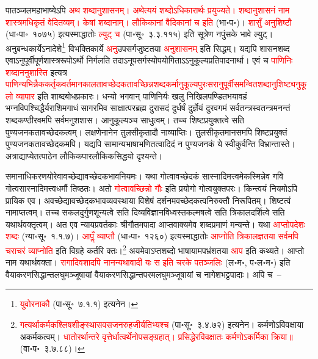 \begin{sloppypar}\justifying\noindent\hspace{10mm} पातञ्जल\-महाभाष्येऽपि \textcolor{red}{अथ शब्दानुशासनम्। अथेत्ययं शब्दोऽधिकारार्थः प्रयुज्यते। शब्दानुशासनं नाम शास्त्रमधिकृतं वेदितव्यम्। केषां शब्दानाम्। लौकिकानां वैदिकानां च इति} (भा॰प॰)। \textcolor{red}{शासुँ अनुशिष्टौ} (धा॰पा॰~१०७५) इत्यस्माद्धातोः \textcolor{red}{ल्युट् च} (पा॰सू॰~३.३.११५) इति सूत्रेण नपुंसके भावे ल्युट्। अनुबन्ध\-कार्येऽनादेशे\footnote{\textcolor{red}{युवोरनाकौ} (पा॰सू॰~७.१.१) इत्यनेन।} विभक्ति\-कार्ये \textcolor{red}{अनु}\-उपसर्ग\-जुष्टतया \textcolor{red}{अनुशासनम्} इति सिद्धम्। यद्यपि शासन\-शब्द एवाऽनुपूर्वी\-पूर्ण\-शास्त्ररूपोऽर्थो निर्गलति तदाऽनूपसर्गस्योप\-योगिताऽऽनुकूल्य\-प्रतिपादनार्था। एवं च \textcolor{red}{पाणिनिः शब्दाननुशास्ति} इत्यत्र \textcolor{red}{पाणिन्यभिन्नैक\-कर्तृक\-वर्तमान\-कालतावच्छेदकतावच्छिन्न\-शब्द\-कर्मानुकूल्य\-पुरःसरानुपूर्वी\-समन्वित\-शब्दानुशिष्ट्यनुकूलो व्यापार} इति शाब्द\-बोध\-प्रकारः। धन्यो भगवान् पाणिनिर्यः खलु निखिल\-पण्डित\-भयावहं भग्न\-विपश्चिद्धैर्य\-राशिमगाधं सागरमिव साक्षात्पर\-ब्रह्म दुरासदं दुर्धर्षं दुर्ज्ञेयं दुरवगमं सर्वतन्त्र\-स्वतन्त्रमनन्तं शब्द\-कण्ठीरवमपि सर्वमनुशशास। आनुकूल्यञ्च साधुत्वम्। तच्च शिष्ट\-प्रयुक्तत्वे सति पुण्य\-जनकतावच्छेदकत्वम्। लक्षणेनानेन तुलसी\-कृतादौ नाव्याप्तिः। तुलसी\-कृत\-मानसमपि शिष्ट\-प्रयुक्तं पुण्य\-जनकतावच्छेदकमपि। यद्यपि सामान्य\-भाषा\-भणितत्वादिदं न पुण्यजनकं ये स्वीकुर्वन्ति विभ्रान्तास्ते। अत्राद्याप्येतत्पाठेन लौकिक\-पारलौकिक\-सिद्धयो दृश्यन्ते। \end{sloppypar}
\begin{sloppypar}\justifying\noindent\hspace{10mm} समानाधिकरणयोरेवावच्छेद्यावच्छेदक\-भाव\-नियमः। यथा गोत्वावच्छेदकं सास्नादिमत्त्वमेकस्मिन्नेव गवि गोत्व\-सास्नादिमत्त्व\-धर्मौ तिष्ठतः। अतो \textcolor{red}{गोत्वावच्छिन्नो गौः} इति प्रयोगो गोत्व\-युक्त\-परः। किन्त्वयं नियमोऽपि प्रायिक एव। अवच्छेद्यावच्छेदक\-भाव\-व्यवस्थाया विशेषं दर्शनमवच्छेदकत्व\-निरुक्तौ निरूपितम्। शिष्टत्वं नामाप्तत्वम्। तच्च सकल\-दुर्गुण\-शून्यत्वे सति दिव्य\-विज्ञान\-विध्वस्त\-कल्मषत्वे सति त्रिकाल\-दर्शित्वे सति यथार्थ\-वक्तृत्वम्। अत एव न्याय\-प्रवर्तकाः श्रीगौतम\-पादा आप्त\-वाक्यमेव शब्द\-प्रमाणं मन्यन्ते। यथा \textcolor{red}{आप्तोपदेशः शब्दः} (न्या॰सू॰~१.१.७)। \textcolor{red}{आपॢँ व्याप्तौ} (धा॰पा॰~१२६०) इत्यस्माद्धातोः \textcolor{red}{आप्नोति त्रिकालज्ञतया सर्वमपि चराचरं व्याप्नोति} इति विग्रहे कर्तरि क्तः।\footnote{\textcolor{red}{गत्यर्थाकर्मक\-श्लिष\-शीङ्स्थास\-वस\-जन\-रुह\-जीर्यतिभ्यश्च} (पा॰सू॰~३.४.७२) इत्यनेन। कर्मणोऽविवक्षाया अकर्मकत्वम्। \textcolor{red}{धातोरर्थान्तरे वृत्तेर्धात्वर्थेनोपसङ्ग्रहात्। प्रसिद्धेरविवक्षातः कर्मणोऽकर्मिका क्रिया॥} (वा॰प॰~३.७.८८)।} अयमेवाऽप्तशब्दो भाषायामप\-भ्रंशतया \textcolor{red}{आप} इति कथ्यते। आप्तो नाम यथार्थ\-वक्ता। \textcolor{red}{रागादि\-वशादपि नानन्यथा\-वादी यः स इति चरके पतञ्जलिः} (ल॰म॰, प॰ल॰म॰) इति वैयाकरण\-सिद्धान्त\-लघु\-मञ्जूषायां वैयाकरण\-सिद्धान्त\-परम\-लघु\-मञ्जूषायां च नागेश\-भट्टपादाः। अपि च~–\end{sloppypar}
